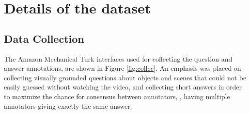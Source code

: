 \section{Details of the \smalldatasetname{} dataset}
\label{sec:ivqadata}

\subsection{Data Collection}
The Amazon Mechanical Turk interfaces used for collecting the question and answer annotations, are shown in Figure \ref{fig:collec}.  
An emphasis was placed on collecting visually grounded questions about objects and scenes that could not be easily guessed without watching the video, and collecting short answers in order to maximize the chance for consensus between annotators, \ie, having multiple annotators giving exactly the same answer.

\begin{table*}[t]
\setlength\tabcolsep{4.5pt}
\begin{center}
\vspace{-0.3cm}
\caption{\small Comparison of our training on \datasetname{} with cross-dataset transfer using the previously largest open-ended VideoQA dataset (MSRVTT-QA) and the largest manually annotated open-ended VideoQA dataset (ActivityNet-QA).}
\vspace{-0.5cm}
\label{table:transfer}
\end{center}
\end{table*}

